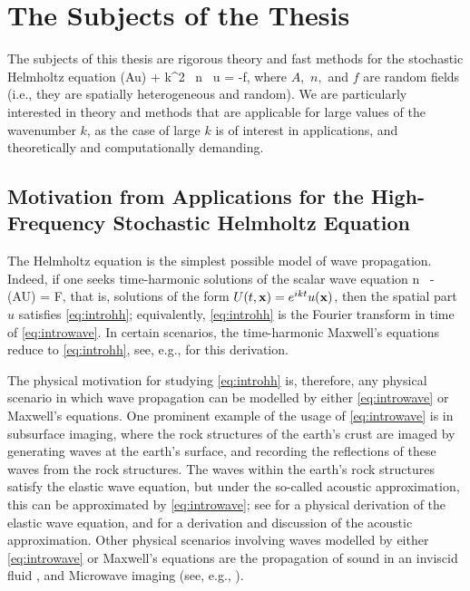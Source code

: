 \section{The Subjects of the Thesis}

The subjects of this thesis are rigorous theory and fast methods for the stochastic Helmholtz equation
\beq\label{eq:introhh}
\grad \cdot \mleft(A\grad u\mright) + k^2 \, n \, u = -f,
\eeq
where $A,$ $n,$ and $f$ are random fields (i.e., they are spatially heterogeneous and random). We are particularly interested in theory and methods that are applicable for large values of the wavenumber $k$, as the case of large $k$ is of interest in applications, and theoretically and computationally demanding.

\subsection{Motivation from Applications for the High-Frequency Stochastic Helmholtz Equation}

The Helmholtz equation is the simplest possible model of wave propagation. Indeed, if one seeks time-harmonic solutions of the scalar wave equation
\beq\label{eq:introwave}
n \,  - \grad \cdot\mleft(A\grad U\mright) = F,
\eeq
that is, solutions of the form $U(t,\mathbf{x}) = e^{ikt}u(\mathbf{x})$, then the spatial part $u$ satisfies \eqref{eq:introhh}; equivalently, \eqref{eq:introhh} is the Fourier transform in time  of \eqref{eq:introwave}. In certain scenarios, the time-harmonic Maxwell's equations reduce to \eqref{eq:introhh}, see, e.g., \cite[Remark 2.1]{MoSp:19} for this derivation.

The physical motivation for studying \eqref{eq:introhh} is, therefore, any physical scenario in which wave propagation can be modelled by either \eqref{eq:introwave} or Maxwell's equations. One prominent example of the usage of \eqref{eq:introwave} is in subsurface imaging, where the rock structures of the earth's crust are imaged by generating waves at the earth's surface, and recording the reflections of these waves from the rock structures. The waves within the earth's rock structures satisfy the elastic wave equation, but under the so-called acoustic approximation, this can be approximated by \eqref{eq:introwave}; see \cite[Section 1.2]{Ch:15} for a physical derivation of the elastic wave equation, and \cite[Section 1.2.6]{Ch:15} for a derivation and discussion of the acoustic approximation. Other physical scenarios involving waves modelled by either \eqref{eq:introwave} or Maxwell's equations are the propagation of sound in an inviscid fluid \cite[Section 2.1]{CoKr:13}, and Microwave imaging (see, e.g., \cite[Section 6.4]{BoDoGrSpTo:19}).

